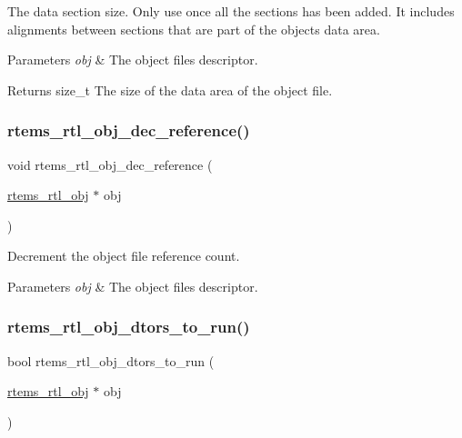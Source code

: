 The data section size. Only use once all the sections has been added. It includes alignments between sections that are part of the object\textquotesingle{}s data area.


\begin{DoxyParams}{Parameters}
{\em obj} & The object file\textquotesingle{}s descriptor. \\
\hline
\end{DoxyParams}
\begin{DoxyReturn}{Returns}
size\+\_\+t The size of the data area of the object file. 
\end{DoxyReturn}
\mbox{\label{rtl-obj_8c_a77c0042ad0312c5043e9d8259171e6f5}} 
\subsubsection{\texorpdfstring{rtems\_rtl\_obj\_dec\_reference()}{rtems\_rtl\_obj\_dec\_reference()}}
{\footnotesize\ttfamily void rtems\+\_\+rtl\+\_\+obj\+\_\+dec\+\_\+reference (\begin{DoxyParamCaption}\item[{\mbox{\hyperlink{structrtems__rtl__obj}{rtems\+\_\+rtl\+\_\+obj}} $\ast$}]{obj }\end{DoxyParamCaption})}

Decrement the object file reference count.


\begin{DoxyParams}{Parameters}
{\em obj} & The object file\textquotesingle{}s descriptor. \\
\hline
\end{DoxyParams}
\mbox{\label{rtl-obj_8c_ae2f95f4733d04acbb018f431340be2db}} 
\subsubsection{\texorpdfstring{rtems\_rtl\_obj\_dtors\_to\_run()}{rtems\_rtl\_obj\_dtors\_to\_run()}}
{\footnotesize\ttfamily bool rtems\+\_\+rtl\+\_\+obj\+\_\+dtors\+\_\+to\+\_\+run (\begin{DoxyParamCaption}\item[{\mbox{\hyperlink{structrtems__rtl__obj}{rtems\+\_\+rtl\+\_\+obj}} $\ast$}]{obj }\end{DoxyParamCaption})}

